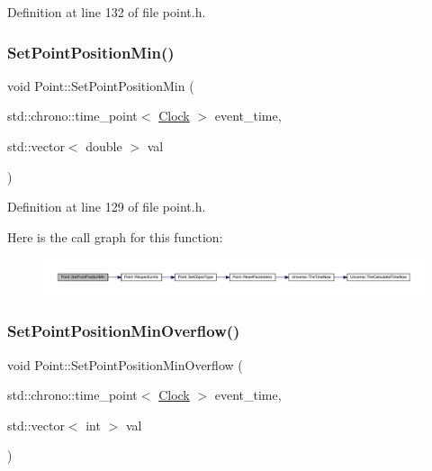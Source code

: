 Definition at line 132 of file point.\+h.

\mbox{\label{class_point_ad47980a6ed515a2def172d757af46f1a}} 
\subsubsection{\texorpdfstring{Set\+Point\+Position\+Min()}{SetPointPositionMin()}}
{\footnotesize\ttfamily void Point\+::\+Set\+Point\+Position\+Min (\begin{DoxyParamCaption}\item[{std\+::chrono\+::time\+\_\+point$<$ \hyperlink{universe_8h_a0ef8d951d1ca5ab3cfaf7ab4c7a6fd80}{Clock} $>$}]{event\+\_\+time,  }\item[{std\+::vector$<$ double $>$}]{val }\end{DoxyParamCaption})\hspace{0.3cm}{\ttfamily [inline]}}



Definition at line 129 of file point.\+h.

Here is the call graph for this function\+:
\nopagebreak
\begin{figure}[H]
\begin{center}
\leavevmode
\includegraphics[width=350pt]{class_point_ad47980a6ed515a2def172d757af46f1a_cgraph}
\end{center}
\end{figure}
\mbox{\label{class_point_ab0c0a837abb8bd52a59f82723a31f61f}} 
\subsubsection{\texorpdfstring{Set\+Point\+Position\+Min\+Overflow()}{SetPointPositionMinOverflow()}}
{\footnotesize\ttfamily void Point\+::\+Set\+Point\+Position\+Min\+Overflow (\begin{DoxyParamCaption}\item[{std\+::chrono\+::time\+\_\+point$<$ \hyperlink{universe_8h_a0ef8d951d1ca5ab3cfaf7ab4c7a6fd80}{Clock} $>$}]{event\+\_\+time,  }\item[{std\+::vector$<$ int $>$}]{val }\end{DoxyParamCaption})\hspace{0.3cm}{\ttfamily [inline]}}



